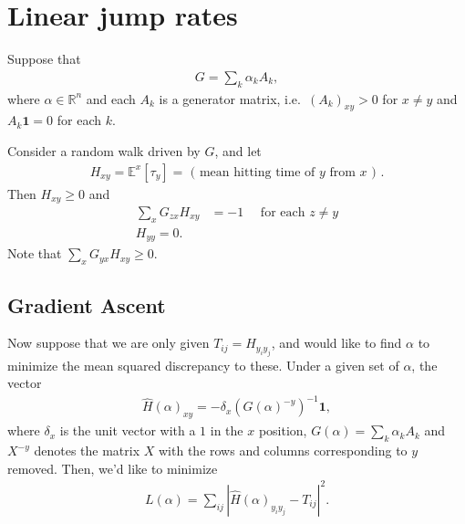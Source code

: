 \documentclass{article}
\newcommand{\R}{\mathbb{R}}
\newcommand{\E}{\mathbb{E}}
\newcommand{\bone}{\mathbf{1}}
\begin{document}
\section{Linear jump rates}

Suppose that 
\begin{align}
  G = \sum_k \alpha_k A_k,
\end{align}
where $\alpha \in \R^n$
and each $A_k$ is a generator matrix,
i.e.\ $(A_k)_{xy} > 0$ for $x\neq y$ and $A_k \bone = 0$ for each $k$.

Consider a random walk driven by $G$, and let
\begin{align}
  H_{xy} = \E^x[\tau_y] = \text{ ( mean hitting time of $y$ from $x$ ) } .
\end{align}
Then  $H_{xy} \ge 0$ and
\begin{align}
  \sum_x G_{zx} H_{xy} &= -1 \quad \text{ for each } z \neq y \\
        H_{yy} = 0 .
\end{align}
Note that $\sum_x G_{yx} H_{xy} \ge 0$.

\subsection*{Gradient Ascent}

Now suppose that we are only given $T_{ij} = H_{y_i y_j}$,
and would like to find $\alpha$ to minimize the mean squared discrepancy to these.
Under a given set of $\alpha$, the vector
\begin{align}
  \hat H(\alpha)_{x y} = - \delta_x (G(\alpha)^{-y})^{-1} \bone ,
\end{align}
where $\delta_x$ is the unit vector with a $1$ in the $x$ position,
$G(\alpha) = \sum_k \alpha_k A_k$ 
and $X^{-y}$ denotes the matrix $X$ with the rows and columns corresponding to $y$ removed.
Then, we'd like to minimize
\begin{align}
  L(\alpha) = \sum_{ij} | \hat H(\alpha)_{y_i y_j} - T_{ij} |^2 .
\end{align}
\end{document}

